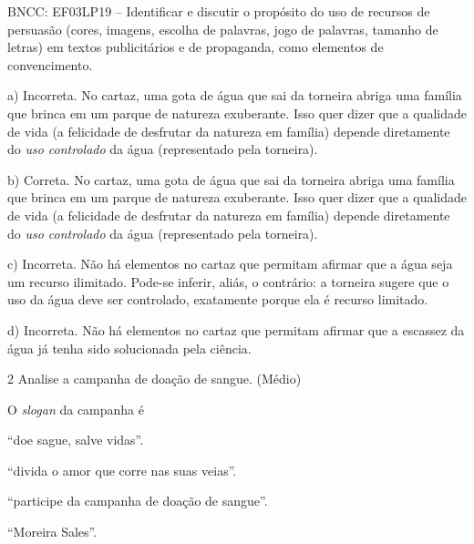 \begin{escolha}
\begin{escolha}
{BNCC: EF03LP19 -- Identificar e discutir o propósito do uso de recursos de
persuasão (cores, imagens, escolha de palavras, jogo de palavras,
tamanho de letras) em textos publicitários e de propaganda, como
elementos de convencimento.

a) Incorreta. No cartaz, uma gota de água que sai da torneira abriga uma 
família que brinca em um parque de natureza exuberante. Isso quer dizer 
que a qualidade de vida (a felicidade de desfrutar da natureza em família)
depende diretamente do \textit{uso controlado} da água (representado pela
torneira). 

b) Correta. No cartaz, uma gota de água que sai da torneira abriga uma 
família que brinca em um parque de natureza exuberante. Isso quer dizer 
que a qualidade de vida (a felicidade de desfrutar da natureza em família)
depende diretamente do \textit{uso controlado} da água (representado pela
torneira). 

c) Incorreta. Não há elementos no cartaz que permitam afirmar que a água 
seja um recurso ilimitado. Pode-se inferir, aliás, o contrário: a torneira
sugere que o uso da água deve ser controlado, exatamente porque ela é recurso
limitado. 

d)  Incorreta. Não há elementos no cartaz que permitam afirmar que a escassez 
da água já tenha sido solucionada pela ciência.}

\num{2} Analise a campanha de doação de sangue. (Médio)


O \emph{slogan} da campanha é

\begin{escolha}
\item ``doe sague, salve vidas''.

\item ``divida o amor que corre nas suas veias''.

\item ``participe da campanha de doação de sangue''.

\item ``Moreira Sales''.
\end{escolha}


\end{escolha}
\end{escolha}
